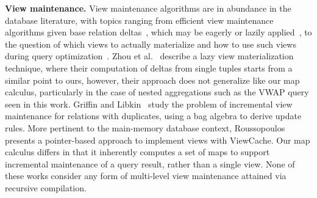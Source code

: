 \textbf{View maintenance.}
View maintenance algorithms are in abundance in the database literature, with
topics ranging from efficient view maintenance algorithms given base relation
deltas~\cite{colby-sigmod:96}, which may be eagerly or lazily
applied~\cite{yan-vldb:95,zhou-vldb:07}, to the question of which views to
actually materialize and how to use such views during query
optimization~\cite{kotidis-tods:01}.
Zhou et al.~\cite{zhou-vldb:07} describe a lazy view materialization technique,
where their computation of deltas from single tuples starts from a similar point
to ours, however, their approach does not generalize like our map calculus,
particularly in the case of nested aggregations such as the VWAP query seen in
this work.
Griffin and Libkin~\cite{griffin-sigmod:95} study the problem of incremental
view maintenance for relations with duplicates, using a bag algebra to derive
update rules.  
More pertinent to the main-memory database context,
Roussopoulos~\cite{roussopoulos-tods:91} presents a pointer-based approach to
implement views with ViewCache.
Our map calculus differs in that it inherently computes a set of maps to support
incremental maintenance of a query result, rather than a single view. None of
these works consider any form of multi-level view maintenance attained via
recursive compilation.

